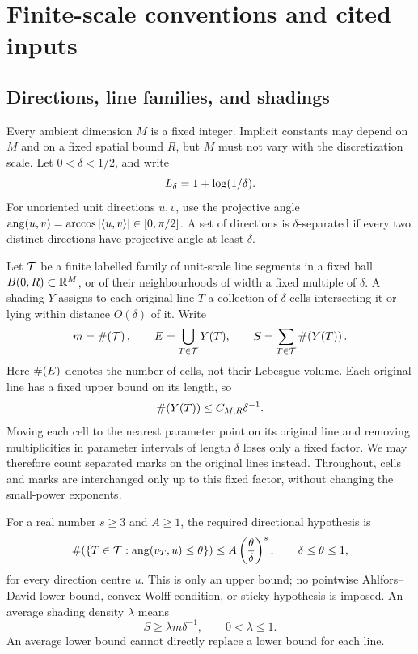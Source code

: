 \section{Finite-scale conventions and cited inputs}\label{sec:preliminaries}

\subsection{Directions, line families, and shadings}
Every ambient dimension $M$ is a fixed integer. Implicit constants may depend on $M$ and on a fixed spatial bound $R$,
but $M$ must not vary with the discretization scale.
Let $0<\delta<1/2$, and write
\[
  L_\delta=1+\log(1/\delta).
\]
For unoriented unit directions $u,v$, use the projective angle
$\operatorname{ang}(u,v)=\arccos|\langle u,v\rangle|\in[0,\pi/2]$.
A set of directions is $\delta$-separated if every two distinct directions have projective angle at least $\delta$.

Let $\mathcal T$ be a finite labelled family of unit-scale line segments in a fixed ball $B(0,R)\subset\mathbb R^M$,
or of their neighbourhoods of width a fixed multiple of $\delta$.
A shading $Y$ assigns to each original line $T$ a collection of $\delta$-cells intersecting it or lying within distance $O(\delta)$ of it.
Write
\[
 m=\#\!\left(\mathcal T\right),\qquad E=\bigcup_{T\in\mathcal T}Y(T),\qquad
 S=\sum_{T\in\mathcal T}\#\!\left(Y(T)\right).
\]
Here $\#\!\left(E\right)$ denotes the number of cells, not their Lebesgue volume.
Each original line has a fixed upper bound on its length, so
\begin{equation}\label{eq:single-line-upper}
  \#\!\left(Y(T)\right)\le C_{M,R}\delta^{-1}.
\end{equation}
Moving each cell to the nearest parameter point on its original line and removing multiplicities in parameter intervals of length $\delta$
loses only a fixed factor. We may therefore count separated marks on the original lines instead.
Throughout, cells and marks are interchanged only up to this fixed factor, without changing the small-power exponents.

For a real number $s\ge3$ and $A\ge1$, the required directional hypothesis is
\begin{equation}\label{eq:angular-cap}
 \#\!\left(\{T\in\mathcal T:\operatorname{ang}(v_T,u)\le\theta\}\right)
 \le A\left(\frac\theta\delta\right)^s,
 \qquad \delta\le\theta\le1,
\end{equation}
for every direction centre $u$.
This is only an upper bound; no pointwise Ahlfors--David lower bound, convex Wolff condition, or sticky hypothesis is imposed.
An average shading density $\lambda$ means
\begin{equation}\label{eq:mean-density}
 S\ge\lambda m\delta^{-1},\qquad 0<\lambda\le1.
\end{equation}
An average lower bound cannot directly replace a lower bound for each line.

